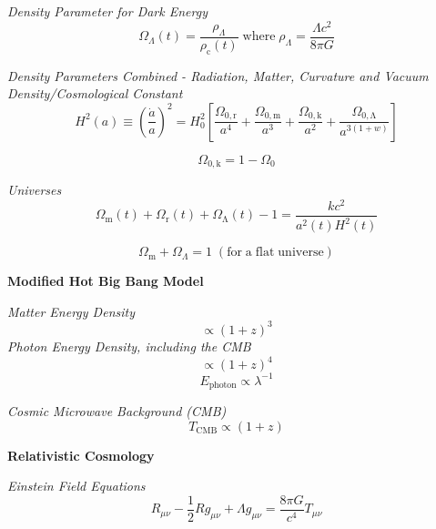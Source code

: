 \documentclass{spy}
\begin{document}
\textit {Density Parameter for Dark Energy}
\begin{equation}
\Omega_\Lambda(t) = \frac {\rho_\Lambda}{\rho_\mathrm{c}(t)} \; \mathrm{where} \; \rho_\Lambda = \frac {\Lambda c^2}{8 \pi G} 
\end{equation}


\textit {Density Parameters Combined - Radiation, Matter, Curvature and Vacuum Density/Cosmological Constant}
\begin{equation}
H^2(a) \equiv \left( \frac {\dot{a}}{a} \right)^2 = H^2_\mathrm{0} \left[ \frac {\Omega_\mathrm{0,r}}{a^4} + \frac {\Omega_\mathrm{0,m}}{a^3} + \frac {\Omega_\mathrm{0,k}}{a^2} + \frac {\Omega_\mathrm{0,\Lambda}}{a^{3(1+w)}} \right]
\end{equation}

\begin{equation}
\Omega_\mathrm{0,k} = 1 - \Omega_0
\end{equation}

\textit{Universes}
\begin{equation}
\Omega_\mathrm{m}(t) + \Omega_\mathrm{r}(t) + \Omega_\mathrm{\Lambda}(t) - 1 = \frac {k c^2}{a^2(t) H^2(t)}
\end{equation}

\begin{equation}
\Omega_\mathrm{m} + \Omega_{\Lambda} = 1 \; (\mathrm{for \; a \; flat \; universe})
\end{equation}
\begin{center}
\end{center}

\textbf{Modified Hot Big Bang Model}

\textit{Matter Energy Density}
\begin{equation}
\propto (1+z)^3
\end{equation}
\textit{Photon Energy Density, including the CMB}
\begin{equation}
\propto (1+z)^4
\end{equation}
\begin{equation}
E_\mathrm{photon} \propto \lambda^{-1}
\end{equation}

\textit{Cosmic Microwave Background (CMB)}
\begin{equation}
T_\mathrm{CMB} \propto (1+z)
\end{equation}


\textbf {Relativistic Cosmology}

\textit {Einstein Field Equations}
\begin{equation}
R_{\mu \nu} - \frac {1}{2} R g_{\mu \nu} +\Lambda g_{\mu \nu} = \frac {8 \pi G}{c^4} T_{\mu \nu}
\end{equation}
\end{document}
